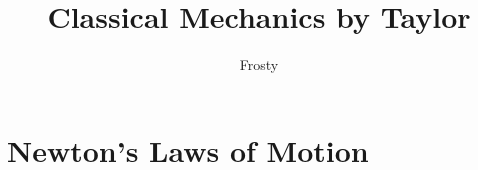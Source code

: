 \documentclass[10pt]{article}  %
\title{Classical Mechanics by Taylor}
\author{Frosty}
\begin{document}
\maketitle

\tableofcontents

\section{Newton's Laws of Motion}

\end{document}
